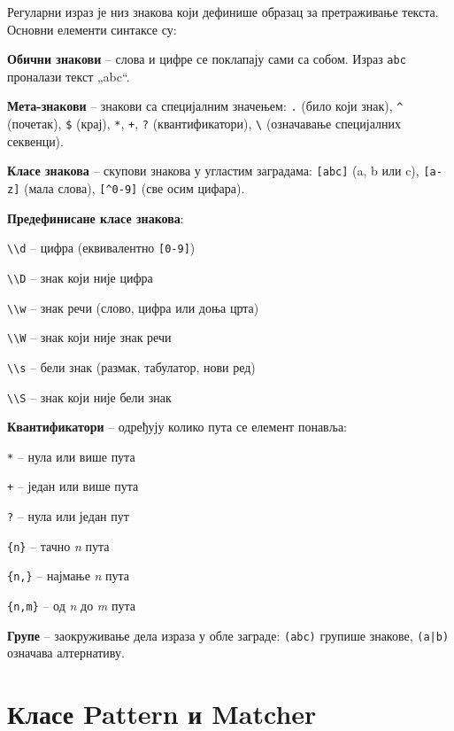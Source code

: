 Регуларни израз је низ знакова који дефинише образац за претраживање текста. Основни елементи синтаксе су:

\textbf{Обични знакови} – слова и цифре се поклапају сами са собом. Израз \texttt{abc} проналази текст „abc“.

\textbf{Мета}\textbf{-}\textbf{знакови} – знакови са специјалним значењем: \texttt{.} (било који знак), \texttt{\textasciicircum{}} (почетак), \texttt{\$} (крај), \texttt{*}, \texttt{+}, \texttt{?} (квантификатори), \texttt{\textbackslash{}} (означавање специјалних секвенци).

\textbf{Класе знакова} – скупови знакова у угластим заградама: \texttt{[abc]} (a, b или c), \texttt{[a-z]} (мала слова), \texttt{[\textasciicircum{}0-9]} (све осим цифара).

\textbf{Предефинисане класе знакова}:

\texttt{\textbackslash{}\textbackslash{}d} – цифра (еквивалентно \texttt{[0-9]})

\texttt{\textbackslash{}\textbackslash{}D} – знак који није цифра

\texttt{\textbackslash{}\textbackslash{}w} – знак речи (слово, цифра или доња црта)

\texttt{\textbackslash{}\textbackslash{}W} – знак који није знак речи

\texttt{\textbackslash{}\textbackslash{}s} – бели знак (размак, табулатор, нови ред)

\texttt{\textbackslash{}\textbackslash{}S} – знак који није бели знак

\textbf{Квантификатори} – одређују колико пута се елемент понавља:

\texttt{*} – нула или више пута

\texttt{+} – један или више пута

\texttt{?} – нула или један пут

\texttt{\{n\}} – тачно \textit{n} пута

\texttt{\{n,\}} – најмање \textit{n} пута

\texttt{\{n,m\}} – од \textit{n} до \textit{m} пута

\textbf{Групе} – заокруживање дела израза у обле заграде: \texttt{(abc)} групише знакове, \texttt{(a|b)} означава алтернативу.


\section{Класе Pattern и Matcher}


